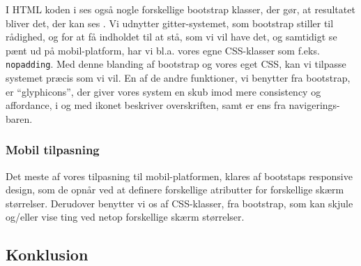 I HTML koden i  ses også nogle forskellige bootstrap klasser, der gør, at resultatet bliver det, der kan ses . 
Vi udnytter gitter-systemet, som bootstrap stiller til rådighed, og for at få indholdet til at stå, som vi vil have det, og samtidigt se pænt ud på mobil-platform, har vi bl.a. vores egne CSS-klasser som f.eks. \texttt{nopadding}. 
Med denne blanding af bootstrap og vores eget CSS, kan vi tilpasse systemet præcis som vi vil. 
En af de andre funktioner, vi benytter fra bootstrap, er ``glyphicons'', der giver vores system en skub imod mere consistency og affordance, i og med ikonet beskriver overskriften, samt er ens fra navigerings-baren.

\subsubsection{Mobil tilpasning}
Det meste af vores tilpasning til mobil-platformen, klares af bootstaps responsive design, som de opnår ved at definere forskellige atributter for forskellige skærm størrelser.
Derudover benytter vi os af CSS-klasser, fra bootstrap, som kan skjule og/eller vise ting ved netop forskellige skærm størrelser.

\subsection{Konklusion}